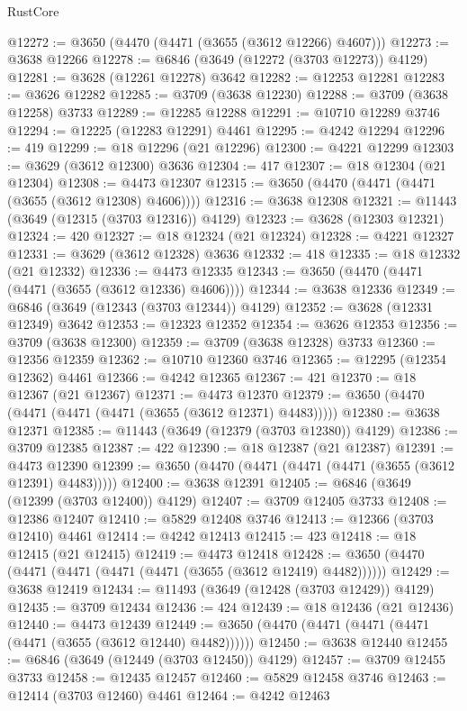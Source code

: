 \begin{lexlean}{RustCore}
\begin{coremodule}
@12272 := @3650 (@4470 (@4471 (@3655 (@3612 @12266) @4607)))
@12273 := @3638 @12266
@12278 := @6846 (@3649 (@12272 (@3703 @12273)) @4129)
@12281 := @3628 (@12261 @12278) @3642
@12282 := @12253 @12281
@12283 := @3626 @12282
@12285 := @3709 (@3638 @12230)
@12288 := @3709 (@3638 @12258) @3733
@12289 := @12285 @12288
@12291 := @10710 @12289 @3746
@12294 := @12225 (@12283 @12291) @4461
@12295 := @4242 @12294
@12296 := 419
@12299 := @18 @12296 (@21 @12296)
@12300 := @4221 @12299
@12303 := @3629 (@3612 @12300) @3636
@12304 := 417
@12307 := @18 @12304 (@21 @12304)
@12308 := @4473 @12307
@12315 := @3650 (@4470 (@4471 (@4471 (@3655 (@3612 @12308) @4606))))
@12316 := @3638 @12308
@12321 := @11443 (@3649 (@12315 (@3703 @12316)) @4129)
@12323 := @3628 (@12303 @12321)
@12324 := 420
@12327 := @18 @12324 (@21 @12324)
@12328 := @4221 @12327
@12331 := @3629 (@3612 @12328) @3636
@12332 := 418
@12335 := @18 @12332 (@21 @12332)
@12336 := @4473 @12335
@12343 := @3650 (@4470 (@4471 (@4471 (@3655 (@3612 @12336) @4606))))
@12344 := @3638 @12336
@12349 := @6846 (@3649 (@12343 (@3703 @12344)) @4129)
@12352 := @3628 (@12331 @12349) @3642
@12353 := @12323 @12352
@12354 := @3626 @12353
@12356 := @3709 (@3638 @12300)
@12359 := @3709 (@3638 @12328) @3733
@12360 := @12356 @12359
@12362 := @10710 @12360 @3746
@12365 := @12295 (@12354 @12362) @4461
@12366 := @4242 @12365
@12367 := 421
@12370 := @18 @12367 (@21 @12367)
@12371 := @4473 @12370
@12379 := @3650 (@4470 (@4471 (@4471 (@4471 (@3655 (@3612 @12371) @4483)))))
@12380 := @3638 @12371
@12385 := @11443 (@3649 (@12379 (@3703 @12380)) @4129)
@12386 := @3709 @12385
@12387 := 422
@12390 := @18 @12387 (@21 @12387)
@12391 := @4473 @12390
@12399 := @3650 (@4470 (@4471 (@4471 (@4471 (@3655 (@3612 @12391) @4483)))))
@12400 := @3638 @12391
@12405 := @6846 (@3649 (@12399 (@3703 @12400)) @4129)
@12407 := @3709 @12405 @3733
@12408 := @12386 @12407
@12410 := @5829 @12408 @3746
@12413 := @12366 (@3703 @12410) @4461
@12414 := @4242 @12413
@12415 := 423
@12418 := @18 @12415 (@21 @12415)
@12419 := @4473 @12418
@12428 := @3650 (@4470 (@4471 (@4471 (@4471 (@4471 (@3655 (@3612 @12419) @4482))))))
@12429 := @3638 @12419
@12434 := @11493 (@3649 (@12428 (@3703 @12429)) @4129)
@12435 := @3709 @12434
@12436 := 424
@12439 := @18 @12436 (@21 @12436)
@12440 := @4473 @12439
@12449 := @3650 (@4470 (@4471 (@4471 (@4471 (@4471 (@3655 (@3612 @12440) @4482))))))
@12450 := @3638 @12440
@12455 := @6846 (@3649 (@12449 (@3703 @12450)) @4129)
@12457 := @3709 @12455 @3733
@12458 := @12435 @12457
@12460 := @5829 @12458 @3746
@12463 := @12414 (@3703 @12460) @4461
@12464 := @4242 @12463

\end{coremodule}
\end{lexlean}

